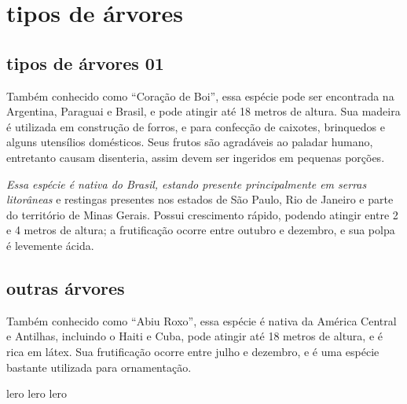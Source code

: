 \documentclass[a4paper,12pt]{article}
\begin{document}
\maketitle
\section{tipos de árvores}%
\subsection{tipos de árvores 01}%
\begin{flushrileft}%
Também conhecido como “Coração de Boi”, essa espécie pode ser encontrada na Argentina, Paraguai e Brasil, e pode atingir até 18 metros de altura. Sua madeira é utilizada em construção de forros, e para confecção de caixotes, brinquedos e alguns utensílios domésticos. Seus frutos são agradáveis ao paladar humano, entretanto causam disenteria, assim devem ser ingeridos em pequenas porções.
\end{flushrileft}%

\begin{center}%
\textit{Essa espécie é nativa do Brasil, estando presente principalmente em serras litorâneas} %
e restingas presentes nos estados de São Paulo, Rio de Janeiro e parte do território de Minas Gerais. Possui crescimento rápido, podendo atingir entre 2 e 4 metros de altura; a frutificação ocorre entre outubro e dezembro, e sua polpa é levemente ácida.
\end{center}%

\begin{flushright}%
\subsection{outras árvores}
Também conhecido como “Abiu Roxo”, essa espécie é nativa da América Central e Antilhas, incluindo o Haiti e Cuba, pode atingir até 18 metros de altura, e é rica em látex. Sua frutificação ocorre entre julho e dezembro, e é uma espécie bastante utilizada para ornamentação.
\end{flushright}

lero lero lero
\end{document}
